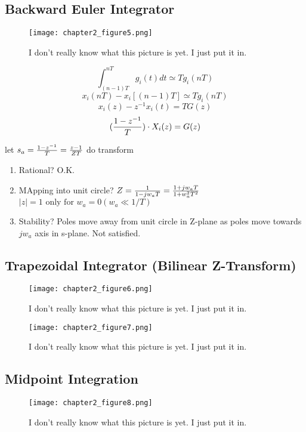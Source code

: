 \documentclass[11pt,fleqn]{book} %
\begin{document}
\subsection{Backward Euler Integrator}

\begin{figure}[h]
  \centering\texttt{[image: chapter2\_figure5.png]}
  \caption{I don't really know what this picture is yet. I just put it in.}
\end{figure}

$$\int_{(n-1)T}^{nT}g_i(t)dt\simeq Tg_i(nT)$$
$$x_i(nT)-x_i[(n-1)T]\simeq Tg_i(nT)$$
$$x_i(z)-z^{-1}x_i(t)=TG(z)$$
$$({1-z^{-1}\over T})\cdot X_i(z)=G(z)$$
\begin{tcolorbox}
  let $s_a={1-z^{-1}\over T}={z-1\over ZT}$ do transform
\end{tcolorbox}

\begin{enumerate}
  \item Rational? O.K.
  \item MApping into unit circle? $Z={1\over 1-jw_aT}={1+jw_aT\over 1+w_a^2T^2}$\\
  $|z|=1\text{ only for }w_a=0 (w_a\ll 1/T)$
  \item Stability? Poles move away from unit circle in Z-plane as poles move
  towards $jw_a$ axis in s-plane. Not satisfied.
\end{enumerate}

\subsection{Trapezoidal Integrator (Bilinear Z-Transform)}

\begin{figure}[h]
  \centering\texttt{[image: chapter2\_figure6.png]}
  \caption{I don't really know what this picture is yet. I just put it in.}
\end{figure}

\begin{figure}[h]
  \centering\texttt{[image: chapter2\_figure7.png]}
  \caption{I don't really know what this picture is yet. I just put it in.}
\end{figure}

\subsection{Midpoint Integration}

\begin{figure}[h]
  \centering\texttt{[image: chapter2\_figure8.png]}
  \caption{I don't really know what this picture is yet. I just put it in.}
\end{figure}
\end{document}
